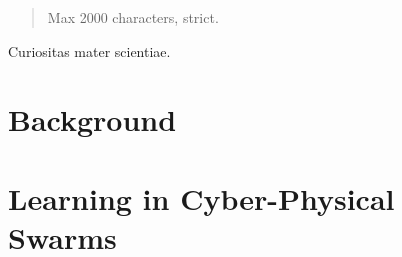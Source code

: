 \documentclass[12pt,a4paper,oneside]{book}
\begin{document}
	
\frontmatter



\begin{abstract}	
Max 2000 characters, strict.
\end{abstract}

\begin{dedication} %
Curiositas mater scientiae.
\end{dedication}

\begin{acknowledgements} %
\end{acknowledgements}
\dominitoc
\adjustmtc
\tableofcontents   
\listoffigures     %
\lstlistoflistings %



\mainmatter

\begin{refsection}\end{refsection}
\part{Background}
\begin{refsection}\end{refsection}
\begin{refsection}\end{refsection}
\begin{refsection}\end{refsection}

\part{Learning in Cyber-Physical Swarms}
\begin{refsection}\end{refsection}
\begin{refsection}\end{refsection}
\begin{refsection}\end{refsection}
\begin{refsection}\end{refsection}
\begin{refsection}\end{refsection}
\end{document}
